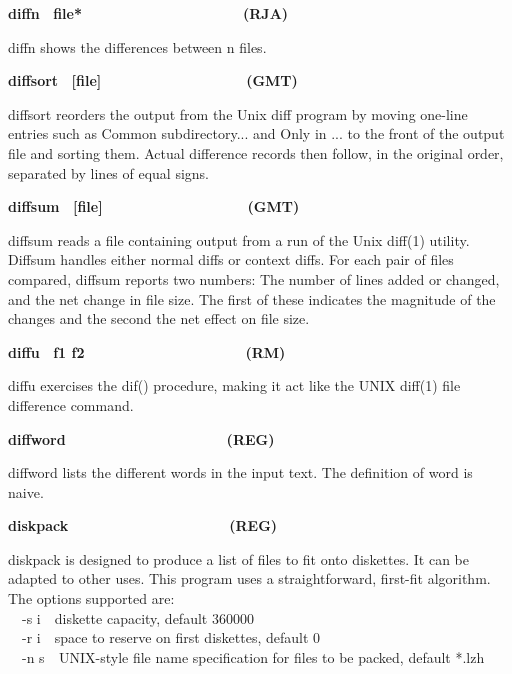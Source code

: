 {\sffamily\bfseries
diffn
\ \textrm{\textmd{file*\ \ \ \ \ \ \ \ \ \ \ \ \ \ \ \ \ \ \ \ }}(RJA)}

\textsf{diffn} shows the differences between n files.

{\sffamily\bfseries
diffsort
\ \textrm{\textmd{[file]\ \ \ \ \ \ \ \ \ \ \ \ \ \ \ \ \ \ }}(GMT)}

\textsf{diffsort} reorders the output from the Unix
{\textquotedbl}diff{\textquotedbl} program by moving one-line entries
such as {\textquotedbl}Common subdirectory...{\textquotedbl} and
{\textquotedbl}Only in ...{\textquotedbl} to the front of the output
file and sorting them. Actual difference records then follow, in the
original order, separated by lines of equal signs. 

{\sffamily\bfseries
diffsum
\ \textrm{\textmd{[file]\ \ \ \ \ \ \ \ \ \ \ \ \ \ \ \ \ \ }}(GMT)}

\textsf{diffsum} reads a file containing output from a run of the Unix
\textsf{diff(1)} utility. Diffsum handles either normal diffs or
context diffs. For each pair of files compared, diffsum reports two
numbers: The number of lines added or changed, and the net change in
file size. The first of these indicates the magnitude of the changes
and the second the net effect on file size. 

{\sffamily\bfseries
diffu \ \textrm{\textmd{f1 f2\ \ \ \ \ \ \ \ \ \ \ \ \ \ \ \ \ \ \ \ 
}}(RM)}

\textsf{diffu} exercises the \textsf{dif()} procedure, making it act
like the UNIX \textsf{diff(1)} file difference command.

{\sffamily\bfseries
diffword\ \ \ \ \ \ \ \ \ \ \ \ \ \ \ \ \ \ \ \ (REG)}

\textsf{diffword} lists the different words in the input text. The
definition of {\textquotedbl}word{\textquotedbl} is naive. 

{\sffamily\bfseries
diskpack\ \ \ \ \ \ \ \ \ \ \ \ \ \ \ \ \ \ \ \ (REG)}

\textsf{diskpack} is designed to produce a list of files to fit onto
\index{diskettes}diskettes. It can be adapted to other uses. This
program uses a straightforward, first-fit algorithm. The options
supported are:\\
\ \ \textsf{{}-s i}\ \ diskette capacity, default 360000\\
\ \ \textsf{{}-r i}\ \ space to reserve on first diskettes, default
0\\
\ \ \textsf{{}-n s}\texttt{\ \ }UNIX-style file name specification for
files to be packed, default {\textquotedbl}*.lzh{\textquotedbl}

